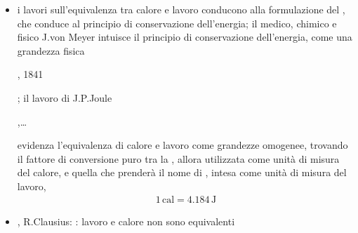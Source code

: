 \documentclass[letterpaper,10pt,italian]{jupyterBook}
\begin{document}
\begin{itemize}
\item {} 
\sphinxAtStartPar
i lavori sull’equivalenza tra calore e lavoro conducono alla formulazione del , che conduce al principio di conservazione dell’energia; il medico, chimico e fisico J.von Meyer intuisce il principio di conservazione dell’energia, come una grandezza fisica %
\begin{footnote}[2]\sphinxAtStartFootnote
{}, 1841
%
\end{footnote}; il lavoro di J.P.Joule%
\begin{footnote}[3]\sphinxAtStartFootnote
{},…
%
\end{footnote} evidenza l’equivalenza di calore e lavoro come grandezze omogenee, trovando il fattore di conversione puro tra la , allora utilizzata come unità di misura del calore, e quella che prenderà il nome di , intesa come unità di misura del lavoro,
\begin{equation*}
\begin{split}1 \, \text{cal} = 4.184 \, \text{J}\end{split}
\end{equation*}
\item {} 
, R.Clausius: : lavoro e calore non sono equivalenti 

\end{itemize}
\label{ch/thermodynamics/foundation-experiments:thermodynamics:history:heat-work:joule}
\end{document}

